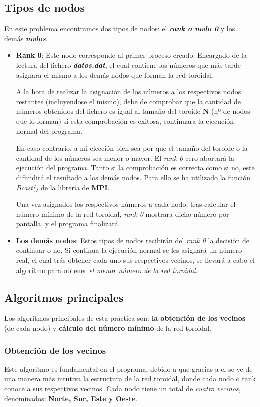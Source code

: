 \documentclass[11pt]{article}
\begin{document}
\subsection{Tipos de nodos}
En este problema encontramos dos tipos de nodos: el \textbf{\textit{rank o nodo 0}} y los demás \textbf{\textit{nodos}}.

\begin{itemize}
	\item \textbf{Rank 0}: Este nodo corresponde al primer proceso creado. Encargado de la lectura del fichero \textit{\textbf{datos.dat}}, el cual contiene los números que más tarde asignara el mismo a los demás nodos que forman la red toroidal.
	
	A la hora de realizar la asignación de los números a los respectivos nodos restantes (incluyendose el mismo), debe de comprobar que la cantidad de números obtenidos del fichero es igual al tamaño del toroide \textbf{N} (nº de nodos que lo forman) si esta comprobación es exitosa, continuara la ejecución normal del programa.
	
	En caso contrario, a mi elección bien sea por que el tamaño del toroide o la cantidad de los números sea menor o mayor. El \textit{rank 0} cero abortará la ejecución del programa. 
	Tanto si la comprobación es correcta como si no, este difundirá el resultado a los demás nodos. Para ello se ha utilizado la función \textit{Bcast()} de la libreria de \textbf{MPI}.
	
	Una vez asignados los respectivos números a cada nodo, tras calcular el número mínimo de la red toroidal, \textit{rank 0} mostrara dicho número por pantalla, y el programa finalizará.
	
	\item \textbf{Los demás nodos}: Estos tipos de nodos recibirán del \textit{rank 0} la decisión de continuar o no. Si continua la ejecución normal se les asignará un número real, el cual trás obtener cada uno sus respectivos vecinos, se  llevará a cabo el algoritmo para obtener \textit{el menor número de la red toroidal}.
\end{itemize}


\subsection{Algoritmos principales}
Los algoritmos principales de esta práctica son: \textbf{la obtención de los vecinos} (de cada nodo) y \textbf{cálculo del número mínimo} de la red toroidal.

\subsubsection{Obtención de los vecinos}
Este algoritmo es fundamental en el programa, debido a que gracias a el se ve de una manera más intutiva la estructura de la red toroidal, donde cada nodo o rank conoce a sus respectivos vecinos. Cada nodo tiene un total de \textit{cuatro vecinos}, denominados: \textbf{Norte, Sur, Este y Oeste}.
\end{document}
